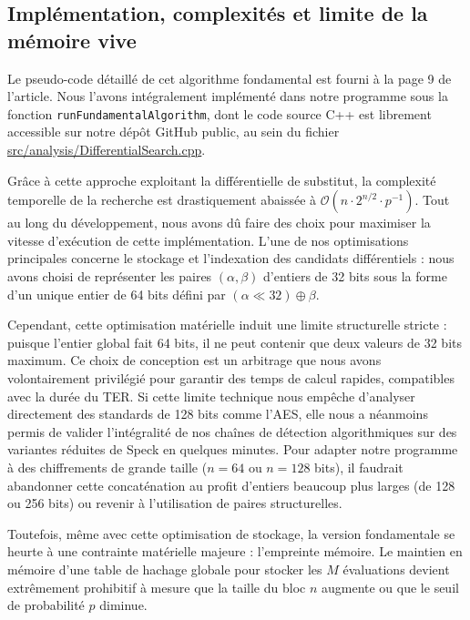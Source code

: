 \documentclass[a4paper,11pt]{article}
\begin{document}
\subsection{Implémentation, complexités et limite de la mémoire vive}
\label{sec:impl_fondamental}

Le pseudo-code détaillé de cet algorithme fondamental est fourni à la page 9 de l'article. Nous l'avons intégralement implémenté dans notre programme sous la fonction \texttt{run\allowbreak Fundamental\allowbreak Algorithm}, dont le code source C++ est librement accessible sur notre dépôt GitHub public, au sein du fichier \url{src/analysis/DifferentialSearch.cpp}.

Grâce à cette approche exploitant la différentielle de substitut, la complexité temporelle de la recherche est drastiquement abaissée à $\mathcal{O}(n \cdot 2^{n/2} \cdot p^{-1})$. Tout au long du développement, nous avons dû faire des choix pour maximiser la vitesse d'exécution de cette implémentation. L'une de nos optimisations principales concerne le stockage et l'indexation des candidats différentiels : nous avons choisi de représenter les paires $(\alpha, \beta)$ d'entiers de 32 bits sous la forme d'un unique entier de 64 bits défini par $(\alpha \ll 32) \oplus \beta$.

Cependant, cette optimisation matérielle induit une limite structurelle stricte : puisque l'entier global fait 64 bits, il ne peut contenir que deux valeurs de 32 bits maximum. Ce choix de conception est un arbitrage que nous avons volontairement privilégié pour garantir des temps de calcul rapides, compatibles avec la durée du TER. Si cette limite technique nous empêche d'analyser directement des standards de 128 bits comme l'AES, elle nous a néanmoins permis de valider l'intégralité de nos chaînes de détection algorithmiques sur des variantes réduites de Speck en quelques minutes. Pour adapter notre programme à des chiffrements de grande taille ($n = 64$ ou $n = 128$ bits), il faudrait abandonner cette concaténation au profit d'entiers beaucoup plus larges (de 128 ou 256 bits) ou revenir à l'utilisation de paires structurelles.

Toutefois, même avec cette optimisation de stockage, la version fondamentale se heurte à une contrainte matérielle majeure : l'empreinte mémoire. Le maintien en mémoire d'une table de hachage globale pour stocker les $M$ évaluations devient extrêmement prohibitif à mesure que la taille du bloc $n$ augmente ou que le seuil de probabilité $p$ diminue.
\end{document}
